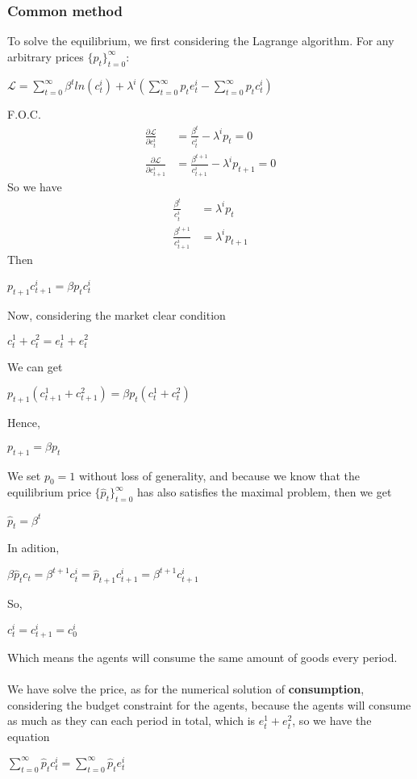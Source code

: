 \documentclass{article}
\begin{document}
\subsubsection{Common method}
To solve the equilibrium, we first considering the Lagrange algorithm. For any arbitrary prices $\{p_t\}^\infty_{t=0}$:\\
\centerline{$\mathscr{L} = \sum\limits^\infty_{t=0} \beta^t ln(c^i_t) + \lambda^i (\sum\limits^\infty_{t=0} p_t e^i_t - \sum\limits^\infty_{t=0} p_tc^i_t)$}
F.O.C.
\begin{align*}
	\frac{\partial \mathscr{L}}{\partial c^i_t} &= \frac{\beta^t}{c^i_t} - \lambda^i p_t = 0\\
	\frac{\partial \mathscr{L}}{\partial c^i_{t+1}} &= \frac{\beta^{t+1}}{c^i_{t+1}} - \lambda^i p_{t+1} = 0
\end{align*}
So we have
\begin{align*}
	\frac{\beta^t}{c^i_t} & = \lambda^i p_t\\
	\frac{\beta^{t+1}}{c^i_{t+1}} &= \lambda^i p_{t+1}
\end{align*}
Then\\
\centerline{$p_{t+1}c^i_{t+1} = \beta p_tc^i_t$}
Now, considering the market clear condition\\
\centerline{$c^1_t + c^2_t = e^1_t + e^2_t$}
We can get\\
\centerline{$p_{t+1}(c^1_{t+1} + c^2_{t+1}) = \beta p_t(c^1_t + c^2_t)$}
Hence,\\
\centerline{$p_{t+1} = \beta p_t$}
We set $p_0 = 1$ without loss of generality, and because we know that the equilibrium price $\{\hat{p}_t\}^\infty_{t=0}$ has also satisfies the maximal problem, then we get\\
\centerline{$\hat{p}_t = \beta^t$}
In adition,\\
\centerline{$\beta \hat{p}_t c_t = \beta^{t+1} c^i_t = \hat{p}_{t+1} c^i_{t+1} = \beta^{t+1} c^i_{t+1}$}
So,\\
\centerline{$c^i_t = c^i_{t+1} = c^i_0$}
Which means the agents will consume the same amount of goods every period.
\\\\
We have solve the price, as for the numerical solution of \textbf{consumption}, considering the budget constraint for the agents, because the agents will consume as much as they can each period in total, which is $e^1_t + e^2_t$, so we have the equation\\
\centerline{$\sum\limits^\infty_{t=0}\hat{p}_t c^i_t = \sum\limits^\infty_{t=0}\hat{p}_t e^i_t$}
\end{document}
